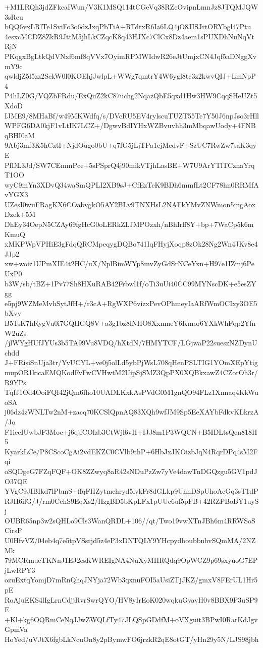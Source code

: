 +M1LRQh3jdZFkcaIWun/V3K1MSQ114tCGeVq38RZcOvipnLmnJz8JTQMJQW3sReu
bQQ6vxLRlTe1SviFo3o6dzJxqPbTiA+RTdtxR6Ia6LQ4jO8JISJrtORYbgl47Ptu
4esxcMCDZ8ZkR9JttM5jhLkCZqcK8q43HJXc7ClCx8Dz4aem1sPUXDhNuNqVtRjN
PKqgxBgLtkQdVNxf6mf8qVVx7OyimRPMWIdwR26eJtUmjxCN4Jqf5aDNggXvmY9c
qwldjZ5l5zz2SckW0l0KOEhjJwlpL+WWg7qmtrY4W6ygl8tc3z2kwvQIJ+LmNpP4
P4hLZ0G/VQZbFRdu/ExQuZ2kC87uchg2NqazQbE5qxd1Hw3HW9CqqSHeUZt5XdoD
IJME9/8MHaBf/w49MKWdfq/s/DVcRU5EV4rylscuTUZT55Tc7Y50J6npJso3rHll
WPFG6DA0kjF1vLtIK7LCZ+/DgwvBdIYHxWZBvuvhh3mMbqawUody+4FNBqBHI0aM
9Abj3mf3K5hCztI+NjdOugo0bU+q7fG5jLjTPa1ejMcdvF+SzUC7RwZw7saK3qyE
PfDL3Jd/SW7CEmmPce+5sPSprQ4j90mikVTjhLasBE+W7U9ArYTlTCznaYrqT1OO
wyC9mYn3XDvQ34waSmQPLI2XB9sJ+CfEzTcK9BDh6mmfLt2CF78hn0RRMfAvYGX3
UZesI0wuFRagKX6COabvgkO5AY2BLv9TNXHsL2NAFkYMvZNWmon5mgAoxDzek+5M
DhEy34OepN5CZAy69fgHcG0oLERkZLJMPOzxh/nBhIrff8Y+bp+7WaCp5k6mKmuQ
xMKPWpVPHiE3gFdqQRCMpeqygDQBo741IqFHyjXoqp8zOk28Ng2Wn4JKv8e4JJp2
xw+woiz1UPmXIE4t2HC/uX/NplBimWYp8mvZyGdSrNCeYxn+H97e1IZmj6PeUxP0
b3W/sb/tBZ+1Pv77Sh8HXuRAB42Frbwl1f/oTi3uUi40CC99MYNscDK+e5esZYgg
e5pj9WZMeMvhSytJfH+/r3cA+RgWXP6vizxPevOPhmeyIaARfWmOCIxy3OE5bXvy
B5TsK7hRygVu0i7GQHGQ8V+a3g1bz8lNHO8XxnmeY6Kmor6YXkWhFqp2YfnW2uZs
/jlWYgHUfJYUs3b5TA99Vu8VDQ/hXtdN/7HMYTCF/LGjwaP22sueszNZDynUchdd
J+FRisiSnUja3tr/YvUCYL+ve0j5olLd5ybPjWsL708qHenPSLTIG1YOmXEpYtig
mupOR1kicaEMQKodFvFwCVHwtM2UipSjSMZ3QpPX0XQBkxawZ4CZorOh3r/R9YPs
TqfJ1Od4OoiFQI42jQm6fho10UADLKxkAsPVdG0M1gnQO94FLz1Xnnaq4KkWuoSA
j06dz4zWNLTw2nM+zacq70KCSlQpnAQ83XQh9wfJM9Sp5EeXAYbFdkvKLkrzA/Jo
F1iecIUwbJF3Moc+j6qjfCOlzb3CtWjl6vH+IJJ8m1P3WQCN+B5IDLtsQen818H5
KyarkLCe/P8CScoCgAi2vdEKZC0CVlb9thP+6HbJxJKOizbJqN4RqrDPq4sM2Fqi
oSQDgeG7FZqFQF+OK8ZZwyq8aR42sNDuPzZw7yVe4dawTnDGQzgu5GV1pdJO37QE
YVgC9JIBIkd7lPbmS+ffqFHZytmchryd5lvkFr8dGLkp9UnnDSpUhoAcGq3sT1dP
RJII6ilG/J/rm0CehS9EqXs2/HzgBD5bKpLFx1pUUc6uf5pFB+42RZPBoBY1uySj
OUBR65np3w2sQHLo9Cls3WanQRDL+106//qt/Two19vwXTnJBh6m4RRWSoSCirsP
U0HfvVZ/04eb4q7e5tpVSsrjd5z4eP3xDNTQLY9YHcpydhoubbnbvSQmMA/2NZMk
79MCRmueTKNnJ1EJ2esKWREIgNA4NuXyMHRQdq9OpWCZ9p69sxyuoG7EPjLwRPY3
ozuExtqYomjD7mRnQhqJNYja72Wb3qxnuFOI5aUsiZTjJKZ/gmxV8FErUL1Hr5pE
RoAjuEKS4lIgLrnCdjjRvrSwrQYO/HV8yIrEoK020wqkuGvavH0v8BBX9P3uSP9E
+Kl+kg6OQRmCeNqJJwZWQLfTy47JLQSpGDdfM+oVXguit3BPwI0RarKdJgvGpmVa
HoYed/uVJtX6fgbLkNcuOn8y2pBymwFO6jrzkR2qE8otGT/yHn29y5N/LJS98jbh
